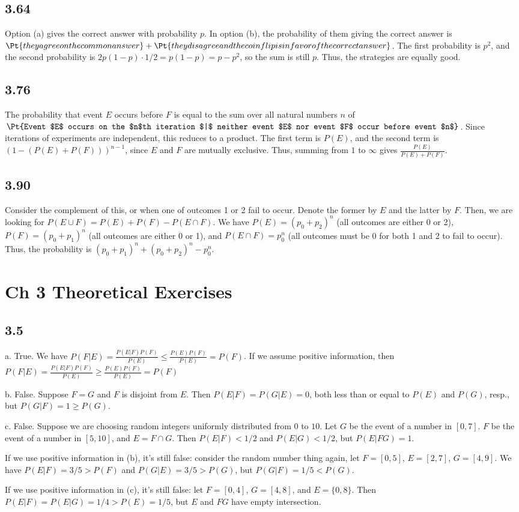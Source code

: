 \documentclass{article}
\begin{document}
\subsection*{3.64}
Option (a) gives the correct answer with probability $p$. In option (b), the probability of them giving the correct answer is $\Pt{they agree on the common answer}+\Pt{they disagree and the coin flip is in favor of the correct answer}$. The first probability is $p^2$, and the second probability is $2p(1-p)\cdot1/2=p(1-p)=p-p^2$, so the sum is still $p$. Thus, the strategies are equally good.
\subsection*{3.76}
The probability that event $E$ occurs before $F$ is equal to the sum over all natural numbers $n$ of $\Pt{Event $E$ occurs on the $n$th iteration $|$ neither event $E$ nor event $F$ occur before event $n$}$. Since iterations of experiments are independent, this reduces to a product. The first term is $P(E)$, and the second term is $(1-(P(E)+P(F)))^{n-1}$, since $E$ and $F$ are mutually exclusive. Thus, summing from $1$ to $\infty$ gives $\frac{P(E)}{P(E)+P(F)}$.
\subsection*{3.90}
Consider the complement of this, or when one of outcomes 1 or 2 fail to occur. Denote the former by $E$ and the latter by $F$. Then, we are looking for $P(E\cup F)=P(E)+P(F)-P(E\cap F)$. We have $P(E)=(p_0+p_2)^n$ (all outcomes are either 0 or 2), $P(F)=(p_0+p_1)^n$ (all outcomes are either 0 or 1), and $P(E\cap F)=p_0^n$ (all outcomes must be 0 for both 1 and 2 to fail to occur). Thus, the probability is $(p_0+p_1)^n+(p_0+p_2)^n-p_0^n$.
\section*{Ch 3 Theoretical Exercises}
\subsection*{3.5}
a. True. We have $P(F|E)=\frac{P(E|F)P(F)}{P(E)}\leq\frac{P(E)P(F)}{P(E)}=P(F)$. If we assume positive information, then $P(F|E)=\frac{P(E|F)P(F)}{P(E)}\geq\frac{P(E)P(F)}{P(E)}=P(F)$

b. False. Suppose $F=G$ and $F$ is disjoint from $E$. Then $P(E|F)=P(G|E)=0$, both less than or equal to $P(E)$ and $P(G)$, resp., but $P(G|F)=1\geq P(G)$.

c. False. Suppose we are choosing random integers uniformly distributed from $0$ to $10$. Let $G$ be the event of a number in $[0,7]$. $F$ be the event of a number in $[5,10]$, and $E=F\cap G$. Then $P(E|F)<1/2$ and $P(E|G)<1/2$, but $P(E|FG)=1$. 

If we use positive information in (b), it's still false: consider the random number thing again, let $F=[0,5]$, $E=[2,7]$, $G=[4,9]$. We have $P(E|F)=3/5>P(F)$ and $P(G|E)=3/5>P(G)$, but $P(G|F)=1/5<P(G)$.

If we use positive information in (c), it's still false: let $F=[0,4]$, $G=[4,8]$, and $E=\{0,8\}$. Then $P(E|F)=P(E|G)=1/4>P(E)=1/5$, but $E$ and $FG$ have empty intersection.
\end{document}
